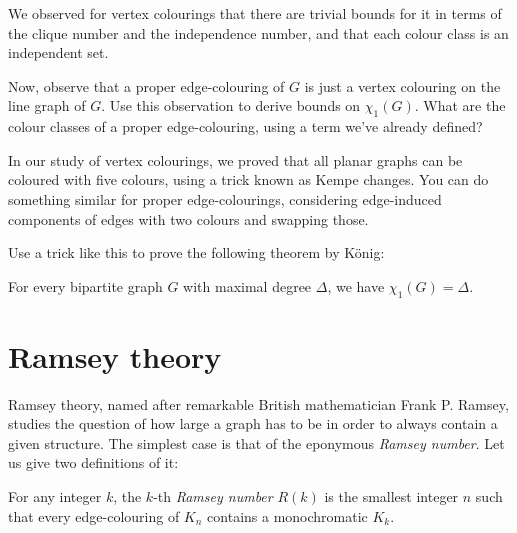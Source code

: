 \documentclass[nobib]{tufte-handout}
\begin{document}
\begin{xca}
    We observed for vertex colourings that there are trivial bounds for it in terms of the clique number and the independence number, and that each colour class is an independent set.

    Now, observe that a proper edge-colouring of $G$ is just a vertex colouring on the line graph of $G$. Use this observation to derive bounds on $\chi_1(G)$. What are the colour classes of a proper edge-colouring, using a term we've already defined?
\end{xca}

In our study of vertex colourings, we proved that all planar graphs can be coloured with five colours, using a trick known as Kempe changes. You can do something similar for proper edge-colourings, considering edge-induced components of edges with two colours and swapping those.

\begin{xca}
    Use a trick like this to prove the following theorem by König:

    \begin{theorem}[König, 1916]
        For every bipartite graph $G$ with maximal degree $\Delta$, we have $\chi_1(G) = \Delta$.
    \end{theorem}
\end{xca}

\section{Ramsey theory}

Ramsey theory, named after remarkable British mathematician Frank P. Ramsey, studies the question of how large a graph has to be in order to always contain a given structure. The simplest case is that of the eponymous \emph{Ramsey number}. Let us give two definitions of it:

\begin{definition}
    For any integer $k$, the $k$-th \emph{Ramsey number} $R(k)$ is the smallest integer $n$ such that every edge-colouring of $K_n$ contains a monochromatic $K_k$.
\end{definition}
\end{document}
